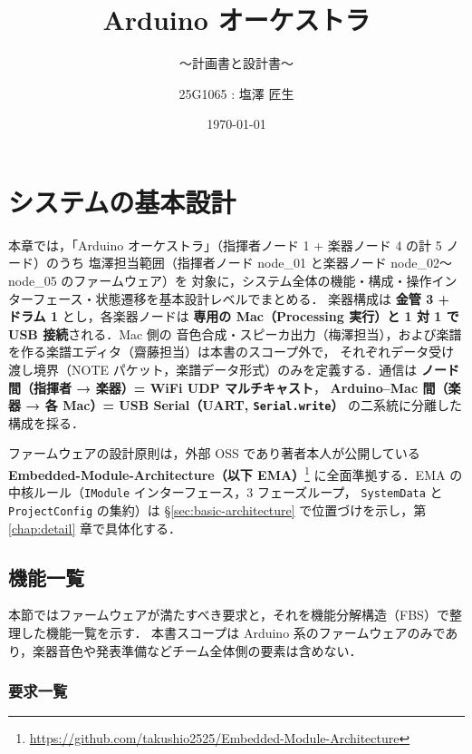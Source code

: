 \documentclass[lualatex,book,paper=a4paper,jafontsize=11.5pt,jafontscale=1.05]{jlreq}
\title{Arduino オーケストラ}
\subtitle{～計画書と設計書～}
\author{
	25G1065 : 塩澤 匠生\\
        }
\date{\today}
\begin{document}
\maketitle

\setcounter{tocdepth}{2}
\tableofcontents \thispagestyle{empty}

\chapter{システムの基本設計}\label{chap:basic}\setcounter{page}{1}

本章では，「Arduino オーケストラ」（指揮者ノード 1 + 楽器ノード 4 の計 5 ノード）のうち
塩澤担当範囲（指揮者ノード node\_01 と楽器ノード node\_02〜node\_05 のファームウェア）を
対象に，システム全体の機能・構成・操作インターフェース・状態遷移を基本設計レベルでまとめる．
楽器構成は \textbf{金管 3 + ドラム 1} とし，各楽器ノードは
\textbf{専用の Mac（Processing 実行）と 1 対 1 で USB 接続}される．Mac 側の
音色合成・スピーカ出力（梅澤担当），および楽譜を作る楽譜エディタ（齋藤担当）は本書のスコープ外で，
それぞれデータ受け渡し境界（NOTE パケット，楽譜データ形式）のみを定義する．通信は \textbf{ノード間（指揮者 → 楽器）= WiFi UDP マルチキャスト}，
\textbf{Arduino--Mac 間（楽器 → 各 Mac）= USB Serial（UART, \texttt{Serial.write}）}
の二系統に分離した構成を採る．

ファームウェアの設計原則は，外部 OSS であり著者本人が公開している
\textbf{Embedded-Module-Architecture（以下 EMA）}\footnote{\url{https://github.com/takushio2525/Embedded-Module-Architecture}}
に全面準拠する．EMA の中核ルール（\texttt{IModule} インターフェース，3 フェーズループ，
\texttt{SystemData} と \texttt{ProjectConfig} の集約）は \S\ref{sec:basic-architecture}
で位置づけを示し，第 \ref{chap:detail} 章で具体化する．


\section{機能一覧}\label{sec:basic-functions}

本節ではファームウェアが満たすべき要求と，それを機能分解構造（FBS）で整理した機能一覧を示す．
本書スコープは Arduino 系のファームウェアのみであり，楽器音色や発表準備などチーム全体側の要素は含めない．

\subsection{要求一覧}
\end{document}
